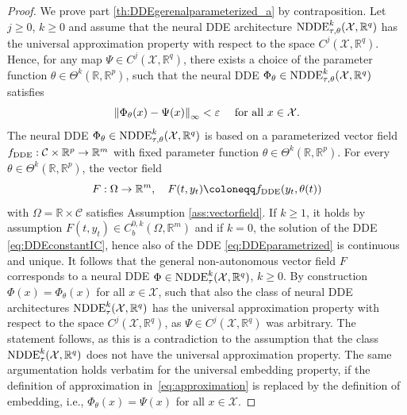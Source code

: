 \documentclass[10pt]{article}
\numberwithin{equation}{section}
\newcommand\norm[1]{\left\lVert#1\right\rVert}
\begin{document}
	\begin{proof}
		We prove part \ref{th:DDEgerenalparameterized_a} by contraposition. Let $j\geq 0$, $k\geq 0$ and assume that the neural DDE architecture $\textup{NDDE}^{k}_{\tau,\theta}(\mathcal{X},\mathbb{R}^q)$ has the universal approximation property with respect to the space $C^j(\mathcal{X},\mathbb{R}^q)$. Hence, for any map $\Psi\in C^j(\mathcal{X}, \mathbb{R}^q)$, there exists a choice of the parameter function $\theta\in \Theta^k(\mathbb{R},\mathbb{R}^{p})$, such that the neural DDE $\Phi_\theta \in\textup{NDDE}^k_{\tau,\theta}(\mathcal{X},\mathbb{R}^q)$ satisfies
		\begin{equation}\label{eq:approximation}
			\norm{\Phi_\theta(x)-\Psi(x)}_\infty < \varepsilon \quad \textup{ for all } x \in \mathcal{X}. 
		\end{equation}
		The neural DDE $\Phi_\theta \in\textup{NDDE}^k_{\tau,\theta}(\mathcal{X},\mathbb{R}^q)$ is based on a parameterized vector field  $f_\textup{DDE}:\mathcal{C}\times \mathbb{R}^{p}\rightarrow \mathbb{R}^m$ with fixed parameter function $\theta\in \Theta^k(\mathbb{R},\mathbb{R}^{p})$. For every $\theta\in \Theta^k(\mathbb{R},\mathbb{R}^{p})$, the vector field 
		\begin{equation*}
			F: \Omega \rightarrow \mathbb{R}^m, \quad F(t,y_t) \coloneqq f_\textup{DDE}(y_t,\theta(t))
		\end{equation*}
		with  $\Omega =  \mathbb{R}\times \mathcal{C}$ satisfies  Assumption \ref{ass:vectorfield}. If $k\geq 1$, it holds by assumption $F(t,y_t) \in C_b^{0,k}(\Omega,\mathbb{R}^m)$ and if $k = 0$, the solution of the DDE \eqref{eq:DDEconstantIC}, hence also of the DDE \eqref{eq:DDEparametrized} is continuous and unique. It follows that the general non-autonomous vector field $F$ corresponds to a neural DDE $\Phi \in\textup{NDDE}^k_{\tau}(\mathcal{X},\mathbb{R}^q)$, \mbox{$k \geq 0$.} By construction $\Phi(x) = \Phi_\theta(x)$ for all $x \in \mathcal{X}$, such that also the class of neural DDE architectures $\textup{NDDE}^k_{\tau}(\mathcal{X},\mathbb{R}^q)$ has the universal approximation property with respect to the space $C^j(\mathcal{X},\mathbb{R}^q)$, as  $\Psi\in C^j(\mathcal{X}, \mathbb{R}^q)$ was arbitrary. The statement follows, as this is a contradiction to the assumption that the class  $\textup{NDDE}^k_{\tau}(\mathcal{X},\mathbb{R}^q)$ does not have the universal approximation property. The same argumentation holds verbatim for the universal embedding property, if the definition of approximation in~\eqref{eq:approximation} is replaced by the definition of embedding, i.e., $\Phi_\theta(x) = \Psi(x)$ for all $x \in \mathcal{X}$.
		

\end{proof}
\end{document}
